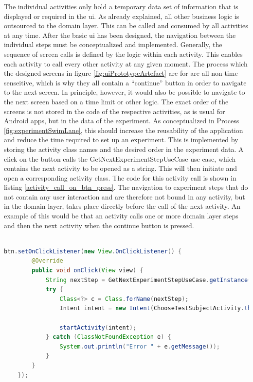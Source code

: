 The individual activities only hold a temporary data set of information that is displayed or required in the \ac{ui}. As already explained, all other business logic is outsourced to the domain layer. This can be called and consumed by all activities at any time. After the basic \ac{ui} has been designed, the navigation between the individual steps must be conceptualized and implemented. Generally, the sequence of screen calls is defined by the logic within each activity. This enables each activity to call every other activity at any given moment. The process which the designed screens in figure \ref{fig:uiPrototypeArtefact} are for are all non time senseitive, which is why they all contain a \enquote{continue} button in order to navigate to the next screen. In principle, however, it would also be possible to navigate to the next screen based on a time limit or other logic. The exact order of the screens is not stored in the code of the respective activities, as is usual for Android apps, but in the data of the experiment. As conceptualized in Process \ref{fig:experimentSwimLane}, this should increase the reusability of the application and reduce the time required to set up an experiment. This is implemented by storing the activity class names and the desired order in the experiment data. A click on the button calls the GetNextExperimentStepUseCase use case, which contains the next activity to be opened as a string. This will then initiate and open a corresponding activity class. The code for this activity call is shown in listing \ref{activity_call_on_btn_press}. The navigation to experiment steps that do not contain any user interaction and are therefore not bound in any activity, but in the domain layer, takes place directly before the call of the next activity. An example of this would be that an activity calls one or more domain layer steps and then the next activity when the continue button is pressed.\\\\

\begin{lstlisting}[language=java,label=activity_call_on_btn_press,lineskip={0pt}, caption=Activity call on button press, basicstyle=\scriptsize, captionpos=b]
    btn.setOnClickListener(new View.OnClickListener() {
        @Override
        public void onClick(View view) {
            String nextStep = GetNextExperimentStepUseCase.getInstance().getNextExperimentStep();
            try {
                Class<?> c = Class.forName(nextStep);
                Intent intent = new Intent(ChooseTestSubjectActivity.this, c);

                startActivity(intent);
            } catch (ClassNotFoundException e) {
                System.out.println("Error " + e.getMessage());
            }
        }
    });
\end{lstlisting}

